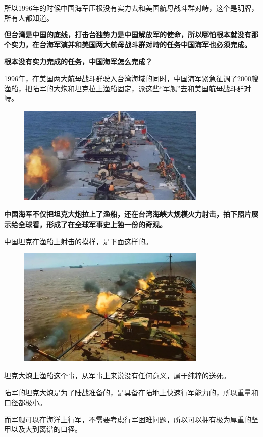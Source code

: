 \documentclass[UTF8, 11pt, oneside]{ctexart}
\newcommand{\zd}[1]{\textbf{\textcolor[RGB]{123,12,0}{#1}}} %
\begin{document}
所以1996年的时候中国海军压根没有实力去和美国航母战斗群对峙，这个是明牌，所有人都知道。

\zd{但台湾是中国的底线，打击台独势力是中国解放军的使命，所以哪怕根本就没有那个实力，在台海军演并和美国两大航母战斗群对峙的任务中国海军也必须完成。}

\zd{根本没有实力完成的任务，中国海军怎么完成？}

1996年，在美国两大航母战斗群驶入台湾海域的同时，中国海军紧急征调了2000艘渔船，把陆军的大炮和坦克拉上渔船固定，派这些“军舰”去和美国航母战斗群对峙。

\begin{figure}[H]
    \centering
    \includegraphics[width=9cm]{2024-08-18-003.jpg}
\end{figure}

\zd{中国海军不仅把坦克大炮拉上了渔船，还在台湾海峡大规模火力射击，拍下照片展示给全球看，形成了在全球军事史上独一份的奇观。}

中国坦克在渔船上射击的摸样，是下面这样的。

\begin{figure}[H]
    \centering
    \includegraphics[width=9cm]{2024-08-18-004.jpg}
\end{figure}

坦克大炮上渔船这个事，从军事上来说没有任何意义，属于纯粹的送死。

陆军的坦克大炮是为了陆战准备的，是具备在陆地上快速行军能力的，所以重量和口径都极小。

而军舰可以在海洋上行军，不需要考虑行军困难问题，所以可以拥有极为厚重的坚甲以及大到离谱的口径。
\end{document}
